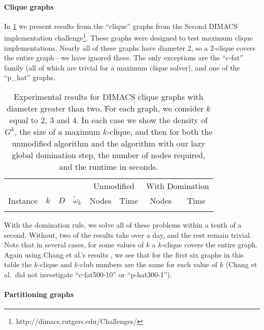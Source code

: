 \documentclass[letterpaper]{article}
\begin{document}
\paragraph{Clique graphs}

In \cref{table:clique} we present results from the ``clique'' graphs from the
Second DIMACS implementation challenge\footnote{http://dimacs.rutgers.edu/Challenges/}. These
graphs were designed to test maximum clique implementations. Nearly all of these graphs have
diameter 2, so a 2-clique covers the entire graph---we have ignored these. The only exceptions are
the ``c-fat'' family (all of which are trivial for a maximum clique solver), and one of the
``p\_hat'' graphs.

\begin{table}
    \tiny
    \begin{tabular}{l c rr rr rr}
        \toprule
        & & & & \multicolumn{2}{c}{Unmodified} & \multicolumn{2}{c}{With Domination} \\
    \cmidrule(lr){5-6}
    \cmidrule(lr){7-8}
    Instance & \multicolumn{1}{c}{$k$} & \multicolumn{1}{c}{$D$} & \multicolumn{1}{c}{$\tilde{\omega}_k$} &
    \multicolumn{1}{c}{Nodes} & \multicolumn{1}{c}{Time} &
    \multicolumn{1}{c}{Nodes} & \multicolumn{1}{c}{Time} \\
    \midrule
    {gen-table-dimacs}
    \bottomrule
\end{tabular}
\caption{Experimental results for DIMACS clique graphs with diameter greater
    than two. For each graph, we consider $k$ equal to 2, 3 and 4. In each case
    we show the density of $G^k$, the size of a maximum $k$-clique, and then
    for both the unmodified algorithm and the algorithm with our lazy global
domination step, the number of nodes required, and the runtime in seconds.}\label{table:clique}
\end{table}

With the domination rule, we solve all of these problems within a tenth of a second. Without, two of
the results take over a day, and the rest remain trivial. Note that in several cases, for some
values of $k$ a $k$-clique covers the entire graph.  Again using Chang et al.'s results
\cite{Chang:2013}, we see that for the first six graphs in this table the $k$-clique and $k$-club
numbers are the same for each value of $k$ (Chang et al.\ did not investigate ``c-fat500-10'' or
``p-hat300-1'').

\paragraph{Partitioning graphs}
\end{document}
